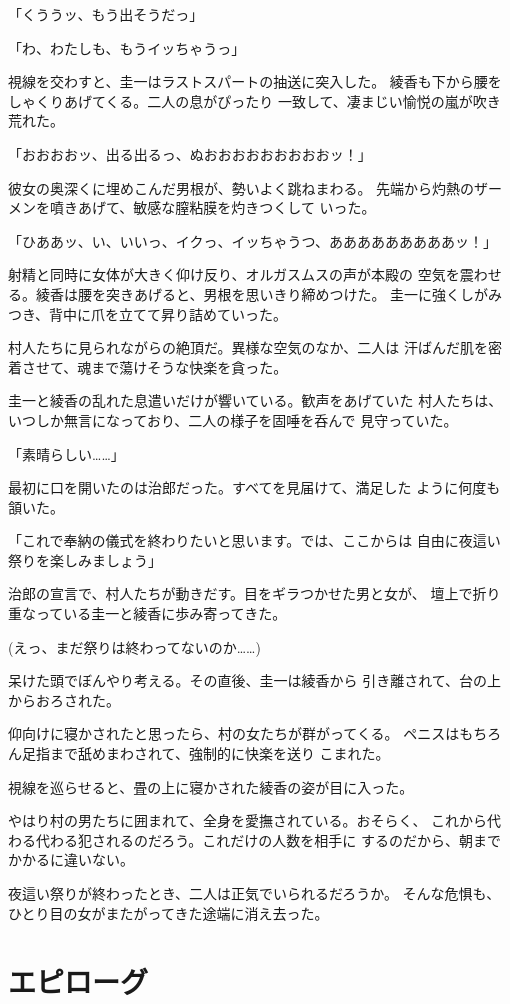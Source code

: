 ﻿\documentclass[
    book,tate,
    line_length=30zw,
    jafontsize=12pt,
    paper=b5j,
    landscape,
    ]{jlreq}
\begin{document}
「くううッ、もう出そうだっ」

「わ、わたしも、もうイッちゃうっ」

視線を交わすと、圭一はラストスパートの抽送に突入した。
綾香も下から腰をしゃくりあげてくる。二人の息がぴったり
一致して、凄まじい愉悦の嵐が吹き荒れた。

「おおおおッ、出る出るっ、ぬおおおおおおおおおッ！」

彼女の奥深くに埋めこんだ男根が、勢いよく跳ねまわる。
先端から灼熱のザーメンを噴きあげて、敏感な膣粘膜を灼きつくして
いった。

「ひああッ、い、いいっ、イクっ、イッちゃうつ、あああああああああッ！」

射精と同時に女体が大きく仰け反り、オルガスムスの声が本殿の
空気を震わせる。綾香は腰を突きあげると、男根を思いきり締めつけた。
圭一に強くしがみつき、背中に爪を立てて昇り詰めていった。

村人たちに見られながらの絶頂だ。異様な空気のなか、二人は
汗ばんだ肌を密着させて、魂まで蕩けそうな快楽を貪った。

圭一と綾香の乱れた息遣いだけが響いている。歓声をあげていた
村人たちは、いつしか無言になっており、二人の様子を固唾を呑んで
見守っていた。

「素晴らしい……」

最初に口を開いたのは治郎だった。すべてを見届けて、満足した
ように何度も頷いた。

「これで奉納の儀式を終わりたいと思います。では、ここからは
自由に夜這い祭りを楽しみましょう」

治郎の宣言で、村人たちが動きだす。目をギラつかせた男と女が、
壇上で折り重なっている圭一と綾香に歩み寄ってきた。

(えっ、まだ祭りは終わってないのか……)

呆けた頭でぼんやり考える。その直後、圭一は綾香から
引き離されて、台の上からおろされた。

仰向けに寝かされたと思ったら、村の女たちが群がってくる。
ペニスはもちろん足指まで舐めまわされて、強制的に快楽を送り
こまれた。

視線を巡らせると、畳の上に寝かされた綾香の姿が目に入った。

やはり村の男たちに囲まれて、全身を愛撫されている。おそらく、
これから代わる代わる犯されるのだろう。これだけの人数を相手に
するのだから、朝までかかるに違いない。

夜這い祭りが終わったとき、二人は正気でいられるだろうか。
そんな危惧も、ひとり目の女がまたがってきた途端に消え去った。

\chapter{エピローグ}
\end{document}

